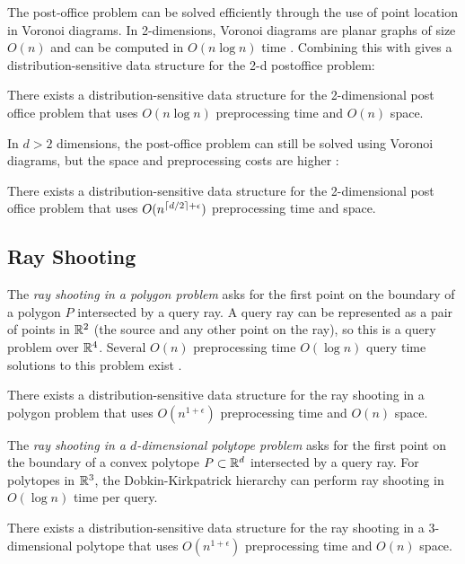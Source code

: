 \documentclass{patmorin}
\begin{document}
The post-office problem can be solved efficiently through the use of
point location in Voronoi diagrams.  In 2-dimensions, Voronoi diagrams
are planar graphs of size $O(n)$ and can be computed in $O(n\log n)$ time
\cite{ps85}.  Combining this with  gives
a distribution-sensitive data structure for the 2-d postoffice problem:

\begin{thm}
  There exists a distribution-sensitive data structure for the
  2-dimensional post office problem that uses $O(n\log n)$ preprocessing
  time and $O(n)$ space.
\end{thm}

In $d >2$ dimensions, the post-office problem can still be solved using
Voronoi diagrams, but the space and preprocessing costs are higher
\cite{c88postoffice}:

\begin{thm}
  There exists a distribution-sensitive data structure for the
  2-dimensional post office problem that uses $O(n^{{\left\lceil d/2 \right\rceil}+\epsilon})$
  preprocessing time and space.
\end{thm}

\subsection{Ray Shooting}

The \emph{ray shooting in a polygon problem} asks for the first point
on the boundary of a polygon $P$ intersected by a query ray.  A query
ray can be represented as a pair of points in $\mathbb{R}^2$ (the source and
any other point on the ray), so this is a query problem over $\mathbb{R}^4$.
Several $O(n)$ preprocessing time $O(\log n)$ query time solutions to
this problem exist \cite{cegghss94,hs95}.

\begin{thm}
  There exists a distribution-sensitive data structure for the ray shooting
  in a polygon problem that uses $O(n^{1+\epsilon})$ preprocessing time and
  $O(n)$ space.
\end{thm}

The \emph{ray shooting in a $d$-dimensional polytope problem}
asks for the first point on the boundary of a convex polytope
$P\subset\mathbb{R}^d$ intersected by a query ray.  For polytopes in $\mathbb{R}^3$,
the Dobkin-Kirkpatrick hierarchy \cite{dk83} can perform ray shooting
in $O(\log n)$ time per query.

\begin{thm}
  There exists a distribution-sensitive data structure for
  the ray shooting in a $3$-dimensional polytope that uses
  $O(n^{1+\epsilon})$ preprocessing time and $O(n)$ space.
\end{thm}
\end{document}
